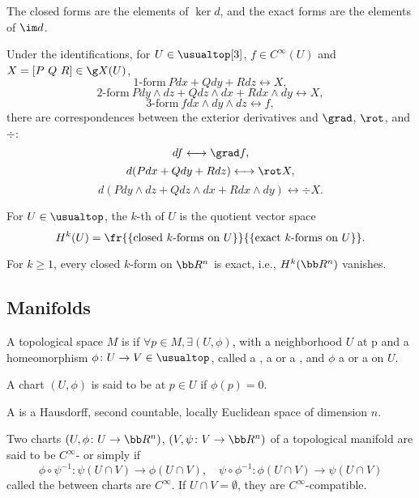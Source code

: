 The closed forms are the elements of $\ker d$, and the exact forms are the elements of $\im d$.

Under the identifications, for $U \in \usualtop[3]$, $f \in C^\infty(U)$ and $X = [P\ Q\ R] \in \g X(U)$,
\[
1\text{-form}\ Pdx + Qdy + Rdz \longleftrightarrow X,
\]
\[
2\text{-form}\ Pdy\wedge dz + Qdz\wedge dx + Rdx\wedge dy \longleftrightarrow X,
\]
\[
3\text{-form}\ f dx\wedge dy\wedge dz \longleftrightarrow f,
\]
there are correspondences between the exterior derivatives and $\grad$, $\rot$, and $\div$:
\[
df \longleftrightarrow \grad f,
\]
\[
d(Pdx + Qdy + Rdz) \longleftrightarrow \rot X,
\]
\[
d(Pdy\wedge dz + Qdz\wedge dx + Rdx\wedge dy) \longleftrightarrow \div X.
\]

For $U \in \usualtop$, the $k$-th  of $U$ is the quotient vector space
\[
H^k (U) = \fr{\{ \text{closed}\ k\text{-forms on}\ U\}}{\{\text{exact}\ k\text{-forms on}\ U\}}.
\]

For $k \ge 1$, every closed $k$-form on $\bb R^n$ is exact, i.e., $H^k (\bb R^n)$ vanishes.

\subsection{Manifolds}
A topological space $M$ is  if $\forall p \in M,\exists (U, \phi)$, with a neighborhood $U$ at p and a homeomorphism $\phi \colon U \to V \in \usualtop$, called a , a  or a , and $\phi$ a  or a  on $U$.

A chart $(U, \phi)$ is said to be  at $p \in U$ if $\phi(p) = 0$.

A  is a Hausdorff, second countable, locally Euclidean space of dimension $n$.

Two charts $(U, \phi \colon U \to \bb R^n)$, $(V, \psi \colon V \to \bb R^n)$ of a topological manifold are said to be $C^\infty$- or simply  if
\[
\phi \circ \psi^{-1} \colon \psi(U \cap V) \to \phi (U \cap V),\quad \psi \circ \phi^{-1} \colon \phi(U\cap V) \to \psi(U\cap V)
\]
called the  between charts are $C^\infty$. If $U \cap V = \emptyset$, they are $C^\infty$-compatible.

